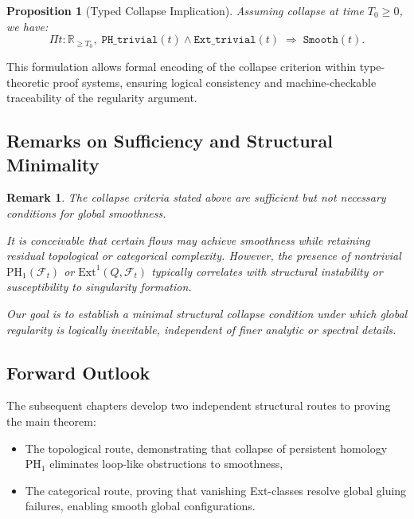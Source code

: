 \documentclass[11pt]{article}
\newtheorem{proposition}[theorem]{Proposition}
\newtheorem{remark}[theorem]{Remark}
\begin{document}
\begin{proposition}[Typed Collapse Implication]
Assuming collapse at time \( T_0 \geq 0 \), we have:
\[
\Pi t : \mathbb{R}_{\geq T_0},\; \texttt{PH\_trivial}(t) \land \texttt{Ext\_trivial}(t) \;\Rightarrow\; \texttt{Smooth}(t).
\]
\end{proposition}

This formulation allows formal encoding of the collapse criterion within type-theoretic proof systems, ensuring logical consistency and machine-checkable traceability of the regularity argument.

\subsection{Remarks on Sufficiency and Structural Minimality}

\begin{remark}
The collapse criteria stated above are \emph{sufficient} but not \emph{necessary} conditions for global smoothness.

It is conceivable that certain flows may achieve smoothness while retaining residual topological or categorical complexity. However, the presence of nontrivial \( \mathrm{PH}_1(\mathcal{F}_t) \) or \( \mathrm{Ext}^1(Q, \mathcal{F}_t) \) typically correlates with structural instability or susceptibility to singularity formation.

Our goal is to establish a minimal structural collapse condition under which global regularity is logically inevitable, independent of finer analytic or spectral details.
\end{remark}

\subsection{Forward Outlook}

The subsequent chapters develop two independent structural routes to proving the main theorem:

\begin{itemize}
  \item The topological route, demonstrating that collapse of persistent homology \( \mathrm{PH}_1 \) eliminates loop-like obstructions to smoothness,
  \item The categorical route, proving that vanishing Ext-classes resolve global gluing failures, enabling smooth global configurations.
\end{itemize}
\end{document}
